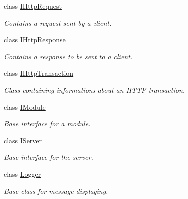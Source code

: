 \begin{DoxyCompactItemize}
class \hyperlink{class_a_p_i_kachu_1_1_i_http_request}{I\+Http\+Request}
\begin{DoxyCompactList}\small\item\em Contains a request sent by a client. \end{DoxyCompactList}\item 
class \hyperlink{class_a_p_i_kachu_1_1_i_http_response}{I\+Http\+Response}
\begin{DoxyCompactList}\small\item\em Contains a response to be sent to a client. \end{DoxyCompactList}\item 
class \hyperlink{class_a_p_i_kachu_1_1_i_http_transaction}{I\+Http\+Transaction}
\begin{DoxyCompactList}\small\item\em Class containing informations about an H\+T\+TP transaction. \end{DoxyCompactList}\item 
class \hyperlink{class_a_p_i_kachu_1_1_i_module}{I\+Module}
\begin{DoxyCompactList}\small\item\em Base interface for a module. \end{DoxyCompactList}\item 
class \hyperlink{class_a_p_i_kachu_1_1_i_server}{I\+Server}
\begin{DoxyCompactList}\small\item\em Base interface for the server. \end{DoxyCompactList}\item 
class \hyperlink{class_a_p_i_kachu_1_1_logger}{Logger}
\begin{DoxyCompactList}\small\item\em Base class for message displaying. \end{DoxyCompactList}\end{DoxyCompactItemize}
